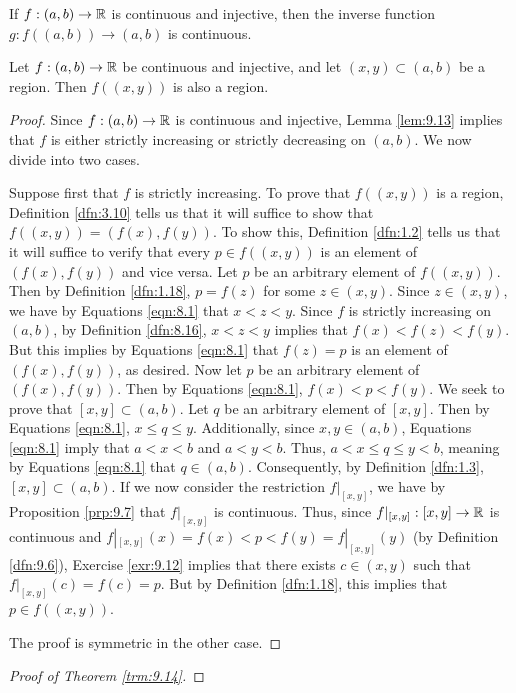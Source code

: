 \documentclass[../main.tex]{subfiles}
\begin{document}
\begin{theorem}\label{trm:9.14}
    If $f:(a,b)\to\mathbb{R}$ is continuous and injective, then the inverse function $g:f((a,b))\to(a,b)$ is continuous.
    \begin{lemma*}
        Let $f:(a,b)\to\mathbb{R}$ be continuous and injective, and let $(x,y)\subset(a,b)$ be a region. Then $f((x,y))$ is also a region.
        \begin{proof}
            Since $f:(a,b)\to\mathbb{R}$ is continuous and injective, Lemma \ref{lem:9.13} implies that $f$ is either strictly increasing or strictly decreasing on $(a,b)$. We now divide into two cases.\par
            Suppose first that $f$ is strictly increasing. To prove that $f((x,y))$ is a region, Definition \ref{dfn:3.10} tells us that it will suffice to show that $f((x,y))=(f(x),f(y))$. To show this, Definition \ref{dfn:1.2} tells us that it will suffice to verify that every $p\in f((x,y))$ is an element of $(f(x),f(y))$ and vice versa. Let $p$ be an arbitrary element of $f((x,y))$. Then by Definition \ref{dfn:1.18}, $p=f(z)$ for some $z\in(x,y)$. Since $z\in(x,y)$, we have by Equations \ref{eqn:8.1} that $x<z<y$. Since $f$ is strictly increasing on $(a,b)$, by Definition \ref{dfn:8.16}, $x<z<y$ implies that $f(x)<f(z)<f(y)$. But this implies by Equations \ref{eqn:8.1} that $f(z)=p$ is an element of $(f(x),f(y))$, as desired. Now let $p$ be an arbitrary element of $(f(x),f(y))$. Then by Equations \ref{eqn:8.1}, $f(x)<p<f(y)$. We seek to prove that $[x,y]\subset(a,b)$. Let $q$ be an arbitrary element of $[x,y]$. Then by Equations \ref{eqn:8.1}, $x\leq q\leq y$. Additionally, since $x,y\in(a,b)$, Equations \ref{eqn:8.1} imply that $a<x<b$ and $a<y<b$. Thus, $a<x\leq q\leq y<b$, meaning by Equations \ref{eqn:8.1} that $q\in(a,b)$. Consequently, by Definition \ref{dfn:1.3}, $[x,y]\subset(a,b)$. If we now consider the restriction $f|_{[x,y]}$, we have by Proposition \ref{prp:9.7} that $f|_{[x,y]}$ is continuous. Thus, since $f|_{[x,y]}:[x,y]\to\mathbb{R}$ is continuous and $f|_{[x,y]}(x)=f(x)<p<f(y)=f|_{[x,y]}(y)$ (by Definition \ref{dfn:9.6}), Exercise \ref{exr:9.12} implies that there exists $c\in(x,y)$ such that $f|_{[x,y]}(c)=f(c)=p$. But by Definition \ref{dfn:1.18}, this implies that $p\in f((x,y))$.\par
            The proof is symmetric in the other case.
        \end{proof}
    \end{lemma*}
    \begin{proof}[Proof of Theorem \ref{trm:9.14}]

\end{proof}
\end{theorem}
\end{document}
